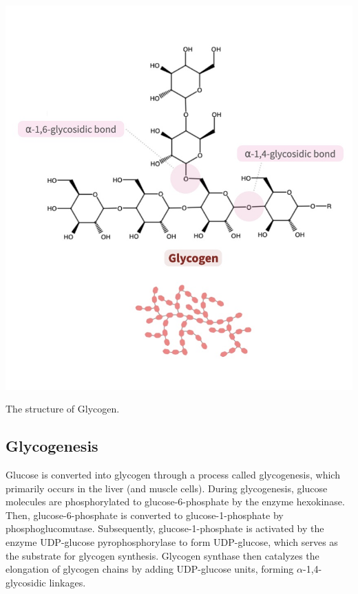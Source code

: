 \documentclass[]{tufte-handout}
\begin{document}
\begin{marginfigure}

{\centering \includegraphics{img/glycogen} 

}

\caption[The structure of Glycogen]{The structure of Glycogen.}\label{fig:unnamed-chunk-2}
\end{marginfigure}

\subsection{Glycogenesis}\label{glycogenesis}

Glucose is converted into glycogen through a process called glycogenesis, which primarily occurs in the liver (and muscle cells). During glycogenesis, glucose molecules are phosphorylated to glucose-6-phosphate by the enzyme hexokinase. Then, glucose-6-phosphate is converted to glucose-1-phosphate by phosphoglucomutase. Subsequently, glucose-1-phosphate is activated by the enzyme UDP-glucose pyrophosphorylase to form UDP-glucose, which serves as the substrate for glycogen synthesis. Glycogen synthase then catalyzes the elongation of glycogen chains by adding UDP-glucose units, forming \(\alpha\)-1,4-glycosidic linkages.
\end{document}
